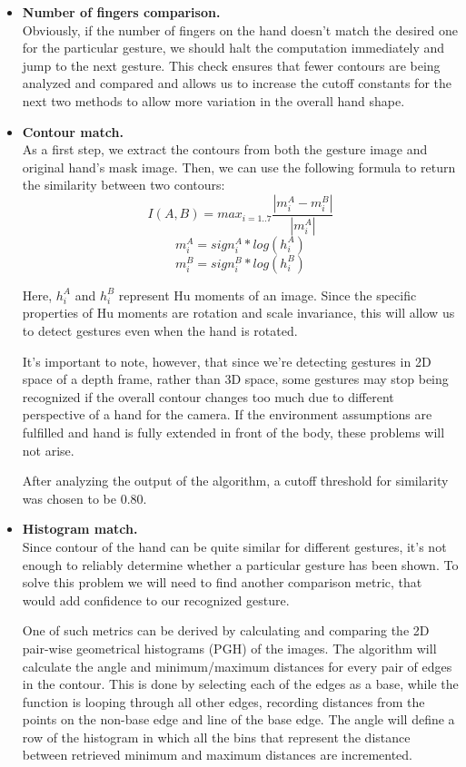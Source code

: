 \documentclass[a4paper,11pt,oneside]{article}
\begin{document}
\begin{itemize}
\item \textbf{Number of fingers comparison.}\\
Obviously, if the number of fingers on the hand doesn't match the desired one for the particular gesture, we should halt the computation immediately and jump to the next gesture. This check ensures that fewer contours are being analyzed and compared and allows us to increase the cutoff constants for the next two methods to allow more variation in the overall hand shape.\\

\item \textbf{Contour match.}\\
As a first step, we extract the contours from both the gesture image and original hand's mask image. Then, we can use the following formula to return the similarity between two contours:
\[ I(A,B) = max_{i=1..7} \frac{|m_i^A - m_i^B|}{|m_i^A|} \]
\[  m_i^A = sign_i^A * log (h_i^A) \]
\[  m_i^B = sign_i^B * log (h_i^B )\]

Here, $h_i^A$ and $h_i^B$ represent Hu moments of an image. Since the specific properties of Hu moments are rotation and scale invariance, this will allow us to detect gestures even when the hand is rotated.

It's important to note, however, that since we're detecting gestures in 2D space of a depth frame, rather than 3D space, some gestures may stop being recognized if the overall contour changes too much due to different perspective of a hand for the camera.  If the environment assumptions are fulfilled and hand is fully extended in front of the body, these problems will not arise.

After analyzing the output of the algorithm, a cutoff threshold for similarity was chosen to be 0.80.\\

\item \textbf{Histogram match.}\\
Since contour of the hand can be quite similar for different gestures, it's not enough to reliably determine whether a particular gesture has been shown. To solve this problem we will need to find another comparison metric, that would add confidence to our recognized gesture.

One of such metrics can be derived by calculating and comparing the 2D pair-wise geometrical histograms (PGH) of the images. The algorithm will calculate the angle and minimum/maximum distances for every pair of edges in the contour. This is done by selecting each of the edges as a base, while the function is looping through all other edges, recording distances from the points on the non-base edge and line of the base edge. The angle will define a row of the histogram in which all the bins that represent the distance between retrieved minimum and maximum distances are incremented.


\end{itemize}
\end{document}
